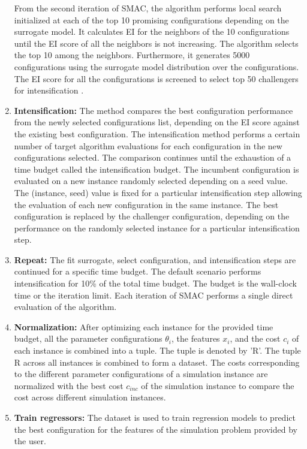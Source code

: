 \begin{enumerate}
From the second iteration of SMAC, the algorithm performs local search initialized at each of the top 10 promising configurations depending on the surrogate model. It calculates EI for the neighbors of the 10 configurations until the EI score of all the neighbors is not increasing. The algorithm selects the top 10 among the neighbors. Furthermore, it generates 5000 configurations using the surrogate model distribution over the configurations. The EI score for all the configurations is screened to select top 50 challengers for intensification \cite{SMAC_mainpaper} \cite{SMAC_extendedpaper}.

\item \textbf{Intensification:} The method compares the best configuration performance from the newly selected configurations list, depending on the EI score against the existing best configuration. The intensification method performs a certain number of target algorithm evaluations for each configuration in the new configurations selected. The comparison continues until the exhaustion of a time budget called the intensification budget. The incumbent configuration is evaluated on a new instance randomly selected depending on a seed value. The (instance, seed) value is fixed for a particular intensification step allowing the evaluation of each new configuration in the same instance. The best configuration is replaced by the challenger configuration, depending on the performance on the randomly selected instance for a particular intensification step.

\item \textbf{Repeat:} The fit surrogate, select configuration, and intensification steps are continued for a specific time budget. The default scenario performs intensification for 10\% of the total time budget. The budget is the wall-clock time or the iteration limit. Each iteration of SMAC performs a single direct evaluation of the algorithm. 

\item \textbf{Normalization:} After optimizing each instance for the provided time budget, all the parameter configurations $\theta_i$, the features $x_i$, and the cost $c_i$ of each instance is combined into a tuple. The tuple is denoted by 'R'. The tuple R across all instances is combined to form a dataset. The costs corresponding to the different parameter configurations of a simulation instance are normalized with the best cost $c_{inc}$ of the simulation instance to compare the cost across different simulation instances.

\item \textbf{Train regressors:} The dataset is used to train regression models to predict the best configuration for the features of the simulation problem provided by the user. 
\end{enumerate}


